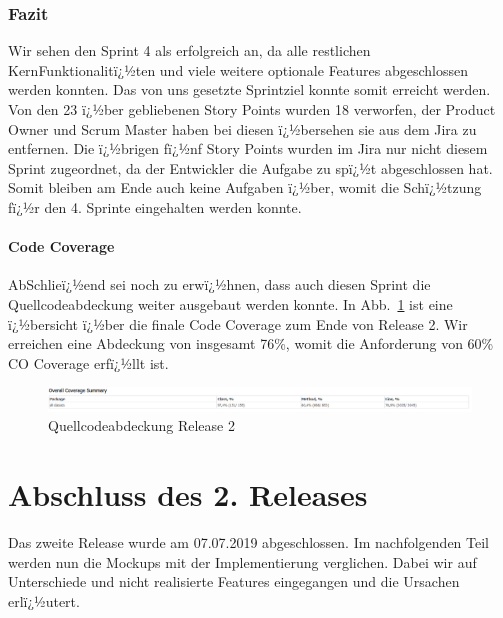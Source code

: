 \documentclass[12pt, titlepage]{scrartcl}
\newcommand{\Abb}[1]{%
	Abb.\ \ref{#1}%
}
\begin{document}
			\subsubsection{Fazit}
			Wir sehen den Sprint 4 als erfolgreich an, da alle restlichen KernFunktionalitï¿½ten und viele weitere optionale Features abgeschlossen werden konnten. Das von uns gesetzte Sprintziel konnte somit erreicht werden. Von den 23 ï¿½ber gebliebenen Story Points wurden 18 verworfen, der Product Owner und Scrum Master haben bei diesen ï¿½bersehen sie aus dem Jira zu entfernen. Die ï¿½brigen fï¿½nf Story Points wurden im Jira nur nicht diesem Sprint zugeordnet, da der Entwickler die Aufgabe zu spï¿½t abgeschlossen hat. Somit bleiben am Ende auch keine Aufgaben ï¿½ber, womit die Schï¿½tzung fï¿½r den 4. Sprinte eingehalten werden konnte.
			
			\paragraph{Code Coverage}
			AbSchlieï¿½end sei noch zu erwï¿½hnen, dass auch diesen Sprint die Quellcodeabdeckung weiter ausgebaut werden konnte. In \Abb{CodeCoverageReleaseTwo} ist eine ï¿½bersicht ï¿½ber die finale Code Coverage zum Ende von Release 2. Wir erreichen eine Abdeckung von insgesamt 76\%, womit die Anforderung von 60\% CO Coverage erfï¿½llt ist.
			
			\begin{figure}[H] 
				\centering
				\includegraphics[width=1\textwidth]{Coverage_Sprint_4.PNG}
				\caption{Quellcodeabdeckung Release 2}
				\label{CodeCoverageReleaseTwo}
			\end{figure}
			
			\section{Abschluss des 2. Releases}
			Das zweite Release wurde am 07.07.2019 abgeschlossen. Im nachfolgenden Teil werden nun die Mockups mit der Implementierung verglichen. Dabei wir auf Unterschiede und nicht realisierte Features eingegangen und die Ursachen erlï¿½utert.
			
\end{document}
